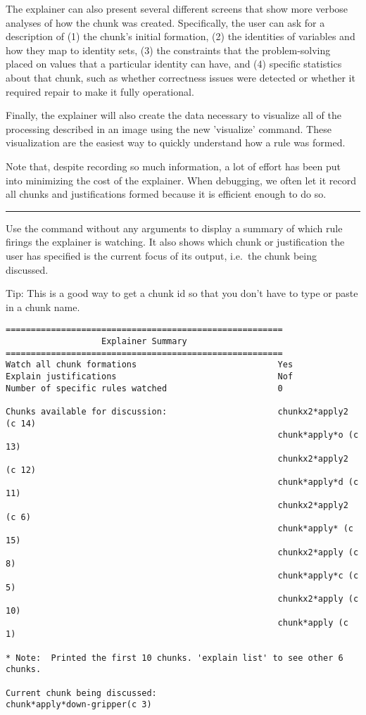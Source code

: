 The explainer can also present several different screens that show more verbose analyses of how the chunk was created. Specifically, the user can ask for a description of (1) the chunk's initial formation, (2) the identities of variables and how they map to identity sets, (3) the constraints that the problem-solving placed on values that a particular identity can have, and (4) specific statistics about that chunk, such as whether correctness issues were detected or whether it required repair to make it fully operational.

Finally, the explainer will also create the data necessary to visualize all of the processing described in an image using the new 'visualize' command. These visualization are the easiest way to quickly understand how a rule was formed.

Note that, despite recording so much information, a lot of effort has been put into minimizing the cost of the explainer. When debugging, we often let it record all chunks and justifications formed because it is efficient enough to do so.

\rule{\textwidth}{1pt}

Use the  command without any arguments to display a summary of which rule firings the explainer is watching. It also shows which chunk or justification the user has specified is the current focus of its output, i.e.~the chunk being discussed.

Tip: This is a good way to get a chunk id so that you don't have to type or paste in a chunk name.

{\footnotesize
\begin{verbatim}
=======================================================
                   Explainer Summary
=======================================================
Watch all chunk formations                            Yes
Explain justifications                                Nof
Number of specific rules watched                      0

Chunks available for discussion:                      chunkx2*apply2 (c 14)
                                                      chunk*apply*o (c 13)
                                                      chunkx2*apply2 (c 12)
                                                      chunk*apply*d (c 11)
                                                      chunkx2*apply2 (c 6)
                                                      chunk*apply* (c 15)
                                                      chunkx2*apply (c 8)
                                                      chunk*apply*c (c 5)
                                                      chunkx2*apply (c 10)
                                                      chunk*apply (c 1)

* Note:  Printed the first 10 chunks. 'explain list' to see other 6 chunks.

Current chunk being discussed:                        chunk*apply*down-gripper(c 3)

\end{verbatim}
}

